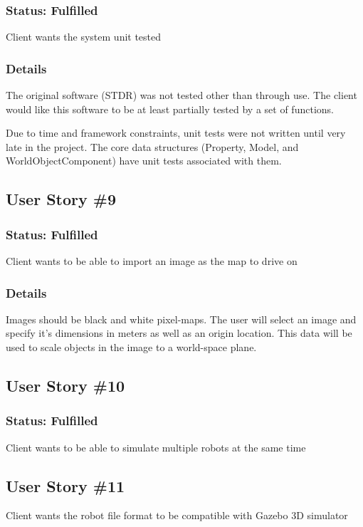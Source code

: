 {\subsubsection*{Status: Fulfilled}
Client wants the system unit tested

\subsubsection*{Details}
The original software (STDR) was not tested other than through use. The client would like this software to be at least partially tested by a set of functions.

Due to time and framework constraints, unit tests were not written until very late in the project. The core data structures (Property, Model, and WorldObjectComponent) have unit tests associated with them.

\subsection{User Story \#9\label{us:9}} 
\subsubsection*{Status: Fulfilled}
Client wants to be able to import an image as the map to drive on

\subsubsection*{Details}
Images should be black and white pixel-maps. The user will select an image and specify it's dimensions in meters as well as an origin location. This data will be used to scale objects in the image to a world-space plane.

\subsection{User Story \#10\label{us:10}} 
\subsubsection*{Status: Fulfilled}
Client wants to be able to simulate multiple robots at the same time

\subsection{User Story \#11\label{us:11}} 
Client wants the robot file format to be compatible with Gazebo 3D simulator

}
